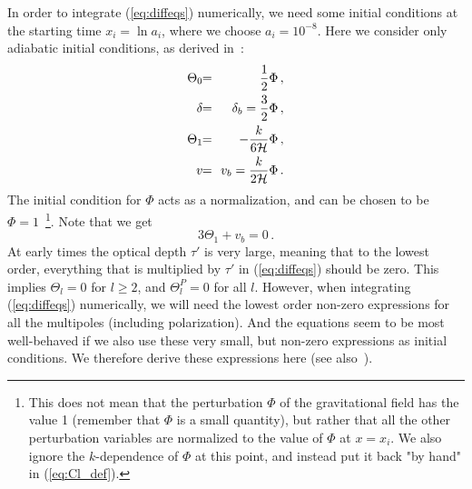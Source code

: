 \documentclass[twocolumn,nofootinbib,amsmath,amssymb]{revtex4}
\newcommand{\be}{\begin{equation}}
\newcommand{\ee}{\end{equation}}
\newcommand{\ba}{\begin{eqnarray}}
\newcommand{\ea}{\end{eqnarray}}
\newcommand{\hs}{\hspace{-1.12mm}}
\newcommand{\eq}{\hs & = & \hs}
\begin{document}
In order to integrate (\ref{eq:diffeqs}) numerically, we need some initial
conditions at the starting time $x_i = \ln a_i$, where we choose $a_i =
10^{-8}$. Here we consider only adiabatic initial conditions, as derived
in~\cite{Dodelson}:
\ba
  \Theta_0 \eq \frac{1}{2} \Phi \, , \nonumber \\
  \delta \eq \delta_b = \frac{3}{2} \Phi \, , \nonumber \\
  \Theta_1 \eq -\frac{k}{6{\cal H}} \Phi \, , \nonumber \\
  v \eq v_b = \frac{k}{2{\cal H}} \Phi \, .
\ea
The initial condition for $\Phi$ acts as a normalization, and can be chosen to
be $\Phi = 1$~\footnote{This does not mean that the perturbation $\Phi$ of the
gravitational field has the value 1 (remember that $\Phi$ is a small quantity),
but rather that all the other perturbation variables are normalized to the
value of $\Phi$ at $x = x_i$. We also ignore the $k$-dependence of $\Phi$ at
this point, and instead put it back "by hand" in (\ref{eq:Cl_def}).}. Note that
we get
\be
  3\Theta_1 + v_b = 0 \, .
\ee
At early times the optical depth $\tau'$ is very large, meaning that to the
lowest order, everything that is multiplied by $\tau'$ in (\ref{eq:diffeqs})
should be zero. This implies $\Theta_l = 0$ for $l \geq 2$, and $\Theta^P_l =
0$ for all $l$. However, when integrating (\ref{eq:diffeqs}) numerically, we
will need the lowest order non-zero expressions for all the multipoles
(including polarization). And the equations seem to be most well-behaved if we
also use these very small, but non-zero expressions as initial conditions. We
therefore derive these expressions here (see also~\cite{Doran, Zald}).
\end{document}
